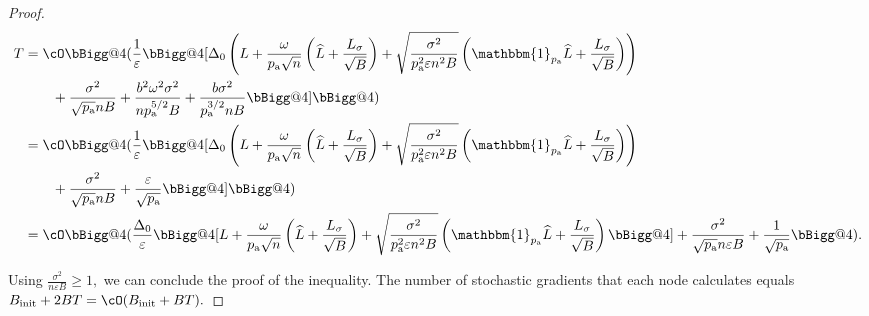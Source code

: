 \documentclass{article}
\makeatletter
\newcommand*{\probavailable}{\ensuremath{p_{\textnormal{a}}}}
\newcommand{\vast}{\bBigg@{4}}
\makeatother
\begin{document}
\begin{proof}
    \begin{align*}
      T&=\cO\vast(\frac{1}{\varepsilon}\vast[\Delta_0\left(L + \frac{\omega}{\probavailable \sqrt{n}} \left(\widehat{L} + \frac{L_{\sigma}}{\sqrt{B}}\right) + \sqrt{\frac{\sigma^2}{\probavailable^2 \varepsilon n^2 B}}\left(\mathbbm{1}_{\probavailable}\widehat{L} + \frac{L_{\sigma}}{\sqrt{B}}\right)\right)\\
      &\qquad + \frac{\sigma^2}{\sqrt{\probavailable} n B}  + \frac{b^2 \omega^2 \sigma^2}{n \probavailable^{5/2} B} + \frac{b \sigma^2}{\probavailable^{3/2} n B}\vast]\vast) \\
      &=\cO\vast(\frac{1}{\varepsilon}\vast[\Delta_0\left(L + \frac{\omega}{\probavailable \sqrt{n}} \left(\widehat{L} + \frac{L_{\sigma}}{\sqrt{B}}\right) + \sqrt{\frac{\sigma^2}{\probavailable^2 \varepsilon n^2 B}}\left(\mathbbm{1}_{\probavailable}\widehat{L} + \frac{L_{\sigma}}{\sqrt{B}}\right)\right)\\
      &\qquad + \frac{\sigma^2}{\sqrt{\probavailable} n B}  + \frac{\varepsilon}{\sqrt{\probavailable}}\vast]\vast) \\
      &=\cO\vast(\frac{\Delta_0}{\varepsilon}\vast[L + \frac{\omega}{\probavailable \sqrt{n}} \left(\widehat{L} + \frac{L_{\sigma}}{\sqrt{B}}\right) + \sqrt{\frac{\sigma^2}{\probavailable^2 \varepsilon n^2 B}}\left(\mathbbm{1}_{\probavailable}\widehat{L} + \frac{L_{\sigma}}{\sqrt{B}}\right)\vast] + \frac{\sigma^2}{\sqrt{\probavailable} n \varepsilon B}  + \frac{1}{\sqrt{\probavailable}} \vast).
    \end{align*}

    Using $\frac{\sigma^2}{n \varepsilon B} \geq 1,$ we can conclude the proof of the inequality. The number of stochastic gradients that each node calculates equals $B_{\textnormal{init}} + 2BT = \cO(B_{\textnormal{init}} + BT).$
\end{proof}

\COROLLARYSTOCHASTICRANDK*
\end{document}
